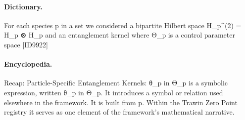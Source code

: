 \paragraph{Dictionary.}
For each species p in a set we considered a bipartite Hilbert space H\_p\textasciicircum{}(2) = H\_p ⊗ H\_p and an entanglement kernel where Θ\_p is a control parameter space [ID9922]

\paragraph{Encyclopedia.}
Recap: Particle-Specific Entanglement Kernels: θ\_p in Θ\_p is a symbolic expression, written θ\_p in Θ\_p. It introduces a symbol or relation used elsewhere in the framework. It is built from p. Within the Trawin Zero Point registry it serves as one element of the framework's mathematical narrative.
